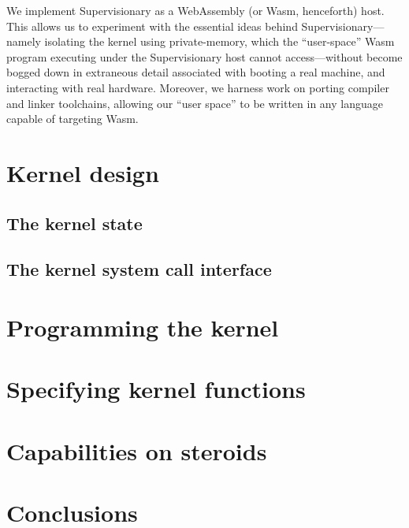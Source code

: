 \documentclass[a4paper, UKenglish, cleveref, autoref, thm-restate]{lipics-v2021}
\begin{document}
We implement Supervisionary as a WebAssembly (or Wasm, henceforth) host.
This allows us to experiment with the essential ideas behind Supervisionary---namely isolating the kernel using private-memory, which the ``user-space'' Wasm program executing under the Supervisionary host cannot access---without become bogged down in extraneous detail associated with booting a real machine, and interacting with real hardware.
Moreover, we harness work on porting compiler and linker toolchains, allowing our ``user space'' to be written in any language capable of targeting Wasm.

\section{Kernel design}
\label{sect.kernel.design}

\subsection{The kernel state}

\subsection{The kernel system call interface}

\section{Programming the kernel}
\label{sect.programming.the.kernel}

\section{Specifying kernel functions}
\label{sect.specifying.kernel.functions}

\section{Capabilities on steroids}
\label{sect.capabilities.on.steroids}

\section{Conclusions}
\label{sect.conclusions}
\end{document}
